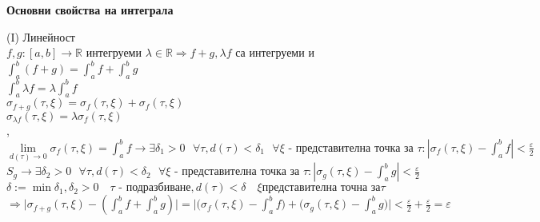 \documentclass[12pt]{article}
\newcommand{\spc}{\text{ }}
\begin{document}
	\begin{center}
		\textbf{Основни свойства на интеграла}
	\end{center}
	(I) Линейност\\
	$f,g:[a,b]\rightarrow\mathbb{R}$ интегруеми $\lambda\in\mathbb{R}\Rightarrow f+g, \lambda f $ са интегруеми и \\$\int_{a}^{b}(f+g)=\int_{a}^{b}f+\int_{a}^{b}g$\\
	$\int_{a}^{b}\lambda f = \lambda\int_{a}^{b}f$\\
	$\sigma_{f+g}(\tau,\xi)=\sigma_f(\tau,\xi)+\sigma_f(\tau,\xi)$\\
	$\sigma_{\lambda f}(\tau,\xi)=\lambda \sigma_f(\tau,\xi)$\\
	, $\lim\limits_{d(\tau)\rightarrow0}\sigma_f(\tau,\xi)=\int_{a}^{b}f\longrightarrow \exists\delta_1>0\spc \forall\tau,d(\tau)<\delta_1\spc \forall\xi\text{ - представителна точка за }\tau:|\sigma_f(\tau,\xi)-\int_{a}^{b}f|<\frac{\varepsilon}{2}$\\
	$S_g\rightarrow\exists\delta_2>0\spc \forall\tau,d(\tau)<\delta_2\spc \forall\xi\text{ - представителна точка за }\tau:|\sigma_g(\tau,\xi)-\int_{a}^{b}g|<\frac{\varepsilon}{2}$\\
	$\delta:=\min{\delta_1,\delta_2}>0\quad\tau\text{ - подразбиване},d(\tau)<\delta\quad \xi\text{представителна точна за}\tau$\\
	$\Rightarrow\Big|\sigma_{f+g}(\tau,\xi)-(\int_{a}^{b}f+\int_{a}^{b}g)\Big|=\Big|\Big(\sigma_{f}(\tau,\xi)-\int_{a}^{b}f\Big)+\Big(\sigma_g(\tau,\xi)-\int_{a}^{b}g\Big)\Big|<\frac{\varepsilon}{2}+\frac{\varepsilon}{2}=\varepsilon$\\
	
\end{document}
